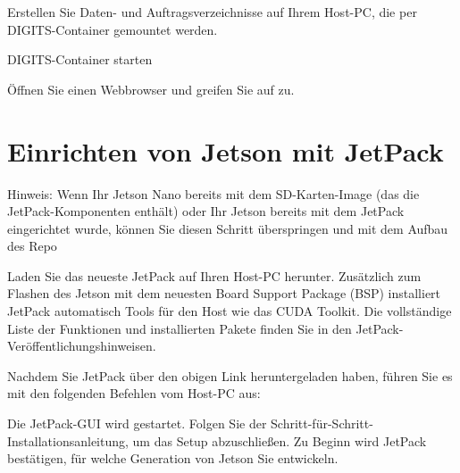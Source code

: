 Erstellen Sie Daten- und Auftragsverzeichnisse auf Ihrem Host-PC, die per DIGITS-Container gemountet werden.

\medskip




\medskip


DIGITS-Container starten

\medskip





\medskip

Öffnen Sie einen Webbrowser und greifen Sie auf  zu.


\section{Einrichten von Jetson mit JetPack}


    Hinweis: Wenn Ihr Jetson Nano bereits mit dem SD-Karten-Image (das die JetPack-Komponenten enthält) oder Ihr Jetson bereits mit dem JetPack eingerichtet wurde, können Sie diesen Schritt überspringen und mit dem Aufbau des Repo

\bigskip

Laden Sie das neueste JetPack auf Ihren Host-PC herunter. Zusätzlich zum Flashen des Jetson mit dem neuesten Board Support Package (BSP) installiert JetPack automatisch Tools für den Host wie das CUDA Toolkit. Die vollständige Liste der Funktionen und installierten Pakete finden Sie in den JetPack-Veröffentlichungshinweisen.

Nachdem Sie JetPack über den obigen Link heruntergeladen haben, führen Sie es mit den folgenden Befehlen vom Host-PC aus:

\medskip






Die JetPack-GUI wird gestartet. Folgen Sie der Schritt-für-Schritt-Installationsanleitung, um das Setup abzuschließen. Zu Beginn wird JetPack bestätigen, für welche Generation von Jetson Sie entwickeln.

